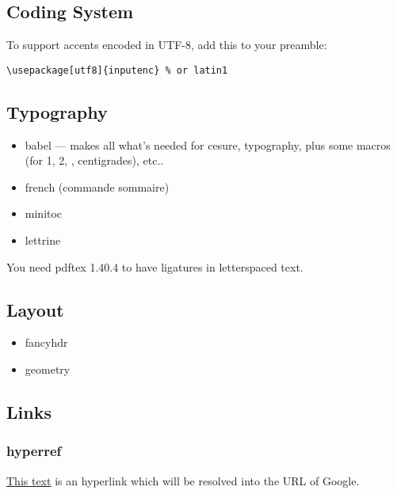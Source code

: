 \documentclass{mcreport}
\begin{document}
\subsection{Coding System}
\label{sec:coding-system}

To support accents encoded in UTF-8, add this to your preamble:

\begin{verbatim}
\usepackage[utf8]{inputenc} % or latin1
\end{verbatim}

\subsection{Typography}
\label{sec:typography}

\begin{itemize}
    \item babel --- makes all what's needed for cesure, typography, plus
    some macros (for 1\ier, 2\ieme, \no, \degres centigrades), etc..
    \item french (commande sommaire)
    \item minitoc
    \item lettrine
\end{itemize}

You need pdftex 1.40.4 to have ligatures in letterspaced text.


\subsection{Layout}
\label{sec:layout}

\begin{itemize}
    \item fancyhdr
    \item geometry
\end{itemize}

\subsection{Links}
\label{sec:links}

\subsubsection{hyperref}
\label{sec:hyperref}

\href{http://www.google.com}{This text} is an hyperlink which will be
resolved into the URL of Google.
\end{document}
